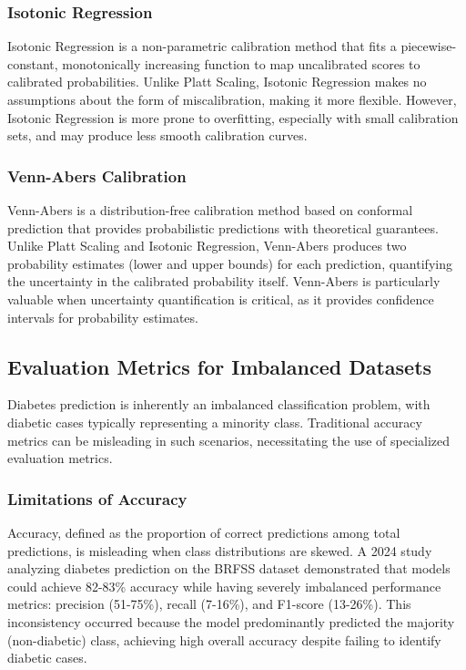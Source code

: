 \subsubsection{Isotonic Regression}

Isotonic Regression is a non-parametric calibration method that fits a piecewise-constant, monotonically increasing function to map uncalibrated scores to calibrated probabilities. Unlike Platt Scaling, Isotonic Regression makes no assumptions about the form of miscalibration, making it more flexible. However, Isotonic Regression is more prone to overfitting, especially with small calibration sets, and may produce less smooth calibration curves.

\subsubsection{Venn-Abers Calibration}

Venn-Abers is a distribution-free calibration method based on conformal prediction that provides probabilistic predictions with theoretical guarantees. Unlike Platt Scaling and Isotonic Regression, Venn-Abers produces two probability estimates (lower and upper bounds) for each prediction, quantifying the uncertainty in the calibrated probability itself. Venn-Abers is particularly valuable when uncertainty quantification is critical, as it provides confidence intervals for probability estimates.

\subsection{Evaluation Metrics for Imbalanced Datasets}

Diabetes prediction is inherently an imbalanced classification problem, with diabetic cases typically representing a minority class. Traditional accuracy metrics can be misleading in such scenarios, necessitating the use of specialized evaluation metrics.

\subsubsection{Limitations of Accuracy}

Accuracy, defined as the proportion of correct predictions among total predictions, is misleading when class distributions are skewed. A 2024 study analyzing diabetes prediction on the BRFSS dataset demonstrated that models could achieve 82-83\% accuracy while having severely imbalanced performance metrics: precision (51-75\%), recall (7-16\%), and F1-score (13-26\%). This inconsistency occurred because the model predominantly predicted the majority (non-diabetic) class, achieving high overall accuracy despite failing to identify diabetic cases.

